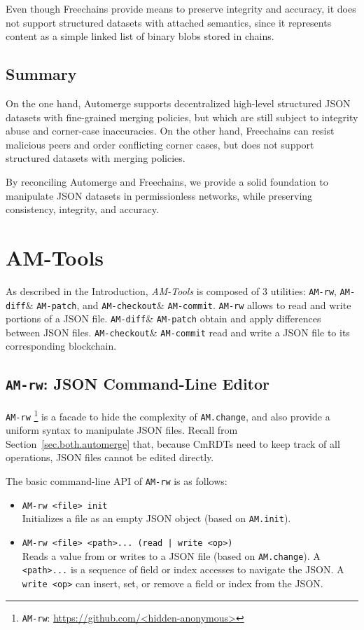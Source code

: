 \documentclass[12pt]{article}
\newcommand{\AMT}      {\emph{AM-Tools}\xspace}
\newcommand{\code}[1]  {\texttt{\footnotesize{#1}}}
\newcommand{\amrw}       {\texttt{AM-rw}\xspace}
\newcommand{\amdiff}     {\texttt{AM-diff}\xspace}
\newcommand{\ampatch}    {\texttt{AM-patch}\xspace}
\newcommand{\amcheckout} {\texttt{AM-checkout}\xspace}
\newcommand{\amcommit}   {\texttt{AM-commit}\xspace}
\begin{document}
Even though Freechains provide means to preserve integrity and accuracy, it
does not support structured datasets with attached semantics, since it
represents content as a simple linked list of binary blobs stored in chains.

\subsection{Summary}

On the one hand, Automerge supports decentralized high-level structured JSON
datasets with fine-grained merging policies, but which are still subject to
integrity abuse and corner-case inaccuracies.
%
On the other hand, Freechains can resist malicious peers and order conflicting
corner cases, but does not support structured datasets with merging policies.

By reconciling Automerge and Freechains, we provide a solid foundation to
manipulate JSON datasets in permissionless networks, while preserving
consistency, integrity, and accuracy.

\section{AM-Tools}
\label{sec.amtools}

As described in the Introduction, \AMT is composed of 3 utilities:
    \amrw,
    \amdiff \& \ampatch, and
    \amcheckout \& \amcommit.
%
\amrw allows to read and write portions of a JSON file.
\amdiff \& \ampatch obtain and apply differences between JSON files.
\amcheckout \& \amcommit read and write a JSON file to its corresponding
blockchain.

\subsection{\amrw: JSON Command-Line Editor}

\amrw%
    \footnote{\amrw: \url{https://github.com/<hidden-anonymous>}}
is a facade to hide the complexity of \code{AM.change}, and also provide a
uniform syntax to manipulate JSON files.
Recall from Section~\ref{sec.both.automerge} that, because CmRDTs need to keep
track of all operations, JSON files cannot be edited directly.

The basic command-line API of \amrw is as follows:

\begin{itemize}
\item \code{AM-rw <file> init} \\
    Initializes a file as an empty JSON object (based on \code{AM.init}).
\item \code{AM-rw <file> <path>... (read | write <op>)} \\
    Reads a value from or writes to a JSON file (based on \code{AM.change}).
    A \code{<path>...} is a sequence of field or index accesses to navigate the
    JSON.
    A \code{write <op>} can insert, set, or remove a field or index from the
    JSON.
\end{itemize}
\end{document}
